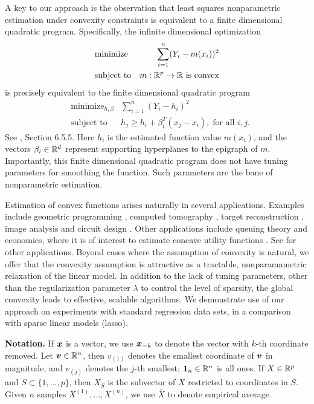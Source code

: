 A key to our approach is the observation that least squares
nonparametric estimation under convexity constraints is equivalent to
a finite dimensional quadratic program.  Specifically, the infinite
dimensional optimization 
\begin{eqnarray}
& \text{minimize} &\sum_{i=1}^n (Y_i - m(x_i))^2 \\
& \text{subject to} & m:{\mathbb R}^p\rightarrow{\mathbb R}\ \text{is convex}
\end{eqnarray}
is precisely equivalent to the finite dimensional quadratic
program 
\begin{eqnarray}
& \text{minimize}_{h, \beta} &\sum_{i=1}^n (Y_i - h_i)^2 \\
& \text{subject to} & h_j \geq h_i + \beta_i^T (x_j-x_i),\; \text{for
    all $i,j$}.
\label{eq:outer}
\end{eqnarray}
See \cite{Boyd04}, Section 6.5.5.
Here $h_i$ is the estimated function value $m(x_i)$, and the vectors
$\beta_i \in {\mathbb R}^d$ represent supporting hyperplanes to the
epigraph of $m$.  Importantly, this finite dimensional quadratic program does
not have tuning parameters for smoothing the function. Such parameters are the bane
of nonparametric estimation.

Estimation of convex functions arises naturally in several
applications.  Examples include geometric programming \cite{Boyd04},
computed tomography \cite{Prince:90}, target reconstruction
\cite{Lele:92}, image analysis \cite{Golden:06} and circuit design
\cite{Hannah:12}.  Other applications include queuing theory
\cite{Chen:01} and economics, where it is of interest to estimate
concave utility functions \cite{Pratt:68}.  See \cite{Lim:12} for
other applications.  Beyond cases where the assumption of convexity is
natural, we offer that the convexity assumption is attractive as a
tractable, nonparamametric relaxation of the linear model.  In
addition to the lack of tuning parameters, other than the
regularization parameter $\lambda$ to control the level of sparsity,
the global convexity leads to effective, scalable algorithms.  We
demonstrate use of our approach on experiments with standard
regression data sets, in a comparison with sparse linear models
(lasso).


\def\mathbf#1{\mbox{\boldmath $#1$}} 

\textbf{Notation.} If
$\mathbf{x}$ is a vector, we use $\mathbf{x}_{-k}$ to denote the
vector with $k$-th coordinate removed. Let $\mathbf{v} \in \R^n$, then
$v_{(1)}$ denotes the smallest coordinate of $\mathbf{v}$ in
magnitude, and $v_{(j)}$ denotes the $j$-th smallest; $\mathbf{1}_n \in \R^n$
is all ones. If $X \in \mathbb{R}^p$ and $S \subset
\{1,...,p\}$, then $X_S$ is the subvector of $X$ restricted to
coordinates in $S$. Given $n$ samples $X^{(1)},...,X^{(n)}$, we use
$\bar{X}$ to denote empirical average.
